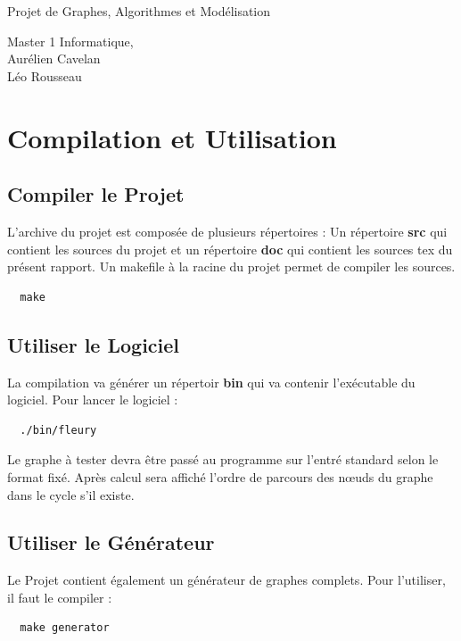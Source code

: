 \documentclass[12pt,a4paper,utf8x]{report}
\begin{document}
\begin{titlepage}

   \hfill
   \begin{center}
   \begin{minipage}[t]{12cm} 
	\huge \center Projet de Graphes, Algorithmes et Modélisation
   \end{minipage}
   \end{center}
\vfill
\begin{flushleft}
\begin{minipage}[t]{5cm}
Master 1 Informatique, \\ Aurélien Cavelan \\ Léo Rousseau
\end{minipage}
\end{flushleft}

\end{titlepage}
\tableofcontents

\chapter{Compilation et Utilisation}
  \section{Compiler le Projet}
  L'archive du projet est composée de plusieurs répertoires : Un répertoire \textbf{src} qui contient les sources du projet et un
  répertoire \textbf{doc} qui contient les sources tex du présent rapport. Un makefile à la racine du projet permet de compiler les sources.

  \begin{lstlisting}
  make
  \end{lstlisting}

  \section{Utiliser le Logiciel}
  La compilation va générer un répertoir \textbf{bin} qui va contenir l'exécutable du logiciel. Pour lancer le logiciel : 
  \begin{lstlisting}
  ./bin/fleury
  \end{lstlisting}

  Le graphe à tester devra être passé au programme sur l'entré standard selon le format fixé. Après calcul sera affiché l'ordre de parcours des nœuds du graphe dans le cycle s'il existe.

  \section{Utiliser le Générateur}
  Le Projet contient également un générateur de graphes complets. Pour l'utiliser, il faut le compiler : 
  \begin{lstlisting}
  make generator
  \end{lstlisting}
\end{document}
